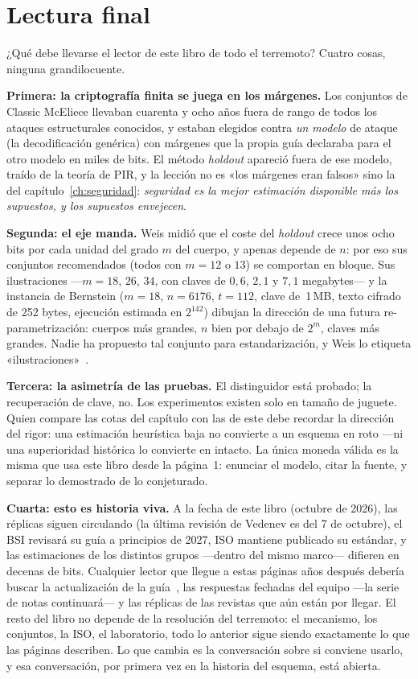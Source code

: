 \section{Lectura final}\label{sec:2026-lectura}

¿Qué debe llevarse el lector de este libro de todo el terremoto?
Cuatro cosas, ninguna grandilocuente.

\textbf{Primera: la criptografía finita se juega en los márgenes.}
Los conjuntos de Classic McEliece llevaban cuarenta y ocho años
fuera de rango de todos los ataques estructurales conocidos, y
estaban elegidos contra \emph{un modelo} de ataque (la
decodificación genérica) con márgenes que la propia guía declaraba
para el otro modelo en miles de bits. El método \emph{holdout}
apareció fuera de ese modelo, traído de la teoría de PIR, y la
lección no es «los márgenes eran falsos» sino la del
capítulo~\ref{ch:seguridad}: \emph{seguridad es la mejor estimación
disponible más los supuestos, y los supuestos envejecen}.

\textbf{Segunda: el eje manda.} Weis midió que el coste del
\emph{holdout} crece unos ocho bits por cada unidad del grado $m$
del cuerpo, y apenas depende de $n$: por eso sus conjuntos
recomendados (todos con $m=12$ o $13$) se comportan en bloque. Sus
ilustraciones ---$m=18$, $26$, $34$, con claves de $0{,}6$, $2{,}1$ y
$7{,}1$ megabytes--- y la instancia de Bernstein ($m=18$,
$n=6176$, $t=112$, clave de~1\,MB, texto cifrado de 252 bytes,
ejecución estimada en $2^{142}$) dibujan la dirección de una
futura re-parametrización: cuerpos más grandes, $n$ bien por debajo
de $2^m$, claves más grandes. Nadie ha propuesto tal conjunto para
estandarización, y Weis lo etiqueta «ilustraciones»~\cite{weis2026}.

\textbf{Tercera: la asimetría de las pruebas.} El distinguidor está
probado; la recuperación de clave, no. Los experimentos existen
solo en tamaño de juguete. Quien compare las cotas del capítulo
con las de este debe recordar la dirección del rigor: una
estimación heurística baja no convierte a un esquema en roto ---ni
una superioridad histórica lo convierte en intacto. La única
moneda válida es la misma que usa este libro desde la
página~1: enunciar el modelo, citar la fuente, y separar lo
demostrado de lo conjeturado.

\textbf{Cuarta: esto es historia viva.} A la fecha de este libro
(octubre de 2026), las réplicas siguen circulando (la última
revisión de Vedenev es del 7 de octubre), el BSI revisará su guía a
principios de 2027, ISO mantiene publicado su estándar, y las
estimaciones de los distintos grupos ---dentro del mismo marco---
difieren en decenas de bits. Cualquier lector que llegue a estas
páginas años después debería buscar la actualización de la
guía~\cite{cmsecurity}, las respuestas fechadas del equipo
---la serie de notas continuará--- y las réplicas de las revistas
que aún están por llegar. El resto del libro no depende de la
resolución del terremoto: el mecanismo, los conjuntos, la ISO, el
laboratorio, todo lo anterior sigue siendo exactamente lo que las
páginas describen. Lo que cambia es la conversación sobre si
conviene usarlo, y esa conversación, por primera vez en la historia
del esquema, está abierta.

